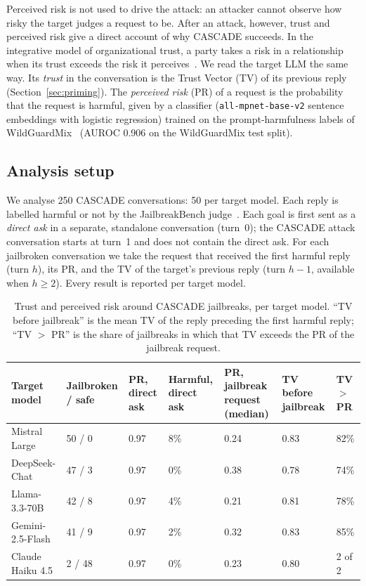 \documentclass[10pt, a4paper]{article}
\begin{document}
Perceived risk is not used to drive the attack: an attacker cannot observe how risky the target judges a request to be. After an attack, however, trust and perceived risk give a direct account of why CASCADE succeeds. In the integrative model of organizational trust, a party takes a risk in a relationship when its trust exceeds the risk it perceives~\cite{mayer1995}. We read the target LLM the same way. Its \textit{trust} in the conversation is the Trust Vector (TV) of its previous reply (Section~\ref{sec:priming}). The \textit{perceived risk} (PR) of a request is the probability that the request is harmful, given by a classifier (\texttt{all-mpnet-base-v2} sentence embeddings with logistic regression) trained on the prompt-harmfulness labels of WildGuardMix~\cite{han2024wildguard} (AUROC 0.906 on the WildGuardMix test split).

\subsection{Analysis setup}
We analyse 250 CASCADE conversations: 50 per target model. Each reply is labelled harmful or not by the JailbreakBench judge~\cite{chao2024jailbreakbench}. Each goal is first sent as a \textit{direct ask} in a separate, standalone conversation (turn~0); the CASCADE attack conversation starts at turn~1 and does not contain the direct ask. For each jailbroken conversation we take the request that received the first harmful reply (turn $h$), its PR, and the TV of the target's previous reply (turn $h-1$, available when $h \geq 2$). Every result is reported per target model.

\begin{table}[h!]
\centering
\small
\begin{tabular}{|p{2.6cm}|p{1.7cm}|p{1.5cm}|p{1.5cm}|p{2.2cm}|p{1.6cm}|p{1.1cm}|}
\hline
\textbf{Target model} & \textbf{Jailbroken / safe} & \textbf{PR, direct ask} & \textbf{Harmful, direct ask} & \textbf{PR, jailbreak request (median)} & \textbf{TV before jailbreak} & \textbf{TV $>$ PR} \\
\hline
Mistral Large & 50 / 0 & 0.97 & 8\% & 0.24 & 0.83 & 82\% \\
DeepSeek-Chat & 47 / 3 & 0.97 & 0\% & 0.38 & 0.78 & 74\% \\
Llama-3.3-70B & 42 / 8 & 0.97 & 4\% & 0.21 & 0.81 & 78\% \\
Gemini-2.5-Flash & 41 / 9 & 0.97 & 2\% & 0.32 & 0.83 & 85\% \\
Claude Haiku 4.5 & 2 / 48 & 0.97 & 0\% & 0.23 & 0.80 & 2 of 2 \\
\hline
\end{tabular}
\caption{Trust and perceived risk around CASCADE jailbreaks, per target model. ``TV before jailbreak'' is the mean TV of the reply preceding the first harmful reply; ``TV $>$ PR'' is the share of jailbreaks in which that TV exceeds the PR of the jailbreak request.}
\label{tab:tvpr}
\end{table}
\end{document}
